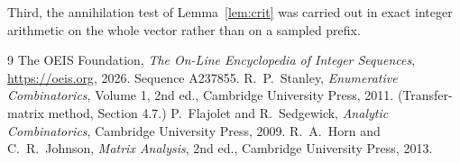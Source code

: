 \documentclass[11pt,a4paper]{article}
\theoremstyle{plain}
\theoremstyle{definition}
\begin{document}
Third, the annihilation test of Lemma~\ref{lem:crit} was carried out in exact integer
arithmetic on the whole vector rather than on a sampled prefix.

\begin{thebibliography}{9}
 The OEIS Foundation, \emph{The On-Line Encyclopedia of Integer
Sequences}, \url{https://oeis.org}, 2026. Sequence A237855.
 R.~P.~Stanley, \emph{Enumerative Combinatorics}, Volume 1, 2nd ed.,
Cambridge University Press, 2011. (Transfer-matrix method, Section 4.7.)
 P.~Flajolet and R.~Sedgewick, \emph{Analytic Combinatorics}, Cambridge
University Press, 2009.
 R.~A.~Horn and C.~R.~Johnson, \emph{Matrix Analysis}, 2nd ed., Cambridge
University Press, 2013.
\end{thebibliography}
\end{document}
